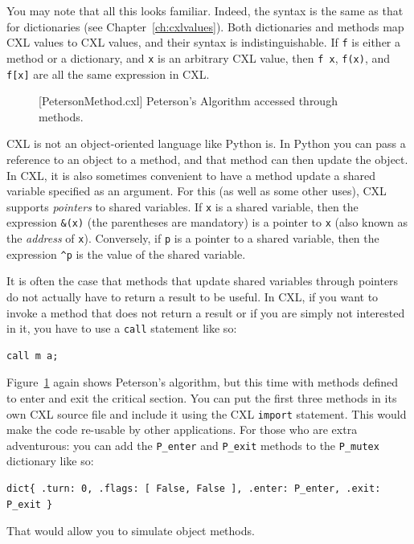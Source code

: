 \documentclass{report}
\newenvironment{code}{
\tcolorbox
}{
\endtcolorbox
}
\begin{document}
You may note that all this looks familiar.  Indeed, the syntax
is the same as that for dictionaries (see Chapter~\ref{ch:cxlvalues}).
Both dictionaries and methods map CXL values to CXL values,
and their syntax is indistinguishable.
If \texttt{f} is either a method or a
dictionary, and \texttt{x} is an arbitrary CXL value, then
\texttt{f x}, \texttt{f(x)}, and \texttt{f[x]} are all
the same expression in CXL.

\begin{figure}
\begin{code}
\end{code}
\caption{[PetersonMethod.cxl] Peterson's Algorithm accessed through methods.}
\label{fig:petersonmethods}
\end{figure}

CXL is not an object-oriented language like Python is.  In Python
you can pass a reference to an object to a method, and that method
can then update the object.  In CXL, it is also sometimes convenient
to have a method update a shared variable specified as an argument.
For this (as well as some other uses), CXL supports \emph{pointers}
to shared variables.
If \texttt{x} is a shared variable, then the expression \texttt{\&(x)}
(the parentheses are mandatory) is a pointer to \texttt{x}
(also known as the \emph{address} of \texttt{x}).
Conversely, if \texttt{p} is a pointer to a shared variable, then the
expression \texttt{\^{}p} is the value of the shared variable.

It is often the case that methods that update shared variables through
pointers do not actually have to return a result to be useful.
In CXL, if you want to invoke a method that does not return a result
or if you are simply not interested in it,
you have to use a \texttt{call} statement like so:
\begin{code}
\begin{verbatim}
call m a;
\end{verbatim}
\end{code}

Figure~\ref{fig:petersonmethods} again shows Peterson's algorithm,
but this time with methods defined to enter and exit the critical
section.
You can put the first three methods in its own CXL source file
and include it using the CXL \texttt{import} statement.  This would
make the code re-usable by other applications.  For those who are
extra adventurous: you can add the \texttt{P\_enter} and
\texttt{P\_exit} methods to the \texttt{P\_mutex} dictionary
like so:
\begin{code}
\begin{verbatim}
dict{ .turn: 0, .flags: [ False, False ], .enter: P_enter, .exit: P_exit }
\end{verbatim}
\end{code}
That would allow you to simulate object methods.
\end{document}

